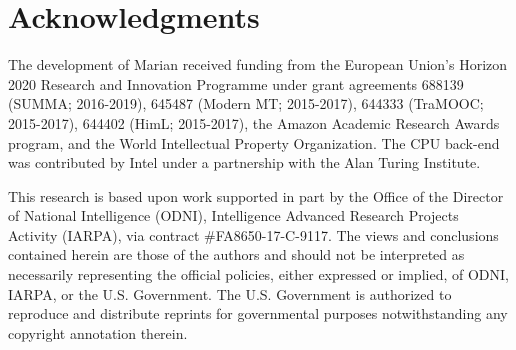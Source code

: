 \documentclass[11pt,a4paper]{article}
\begin{document}
  \section*{Acknowledgments}

  {\small The development of Marian received funding from the European Union's Horizon 2020 Research and Innovation Programme under grant agreements 688139 (SUMMA; 2016-2019), 645487 (Modern MT; 2015-2017), 644333 (TraMOOC; 2015-2017), 644402 (HimL; 2015-2017), the Amazon Academic Research Awards program, and the World Intellectual Property Organization. The CPU back-end was contributed by Intel under a partnership with the Alan Turing Institute. 

   This research is based upon work supported in part by the Office of the Director of National Intelligence (ODNI), Intelligence Advanced Research Projects Activity (IARPA), via contract \#FA8650-17-C-9117. The views and conclusions contained herein are those of the authors and should not be interpreted as necessarily representing the official policies, either expressed or implied, of ODNI, IARPA, or the U.S. Government. The U.S. Government is authorized to reproduce and distribute reprints for governmental purposes notwithstanding any copyright annotation therein.\par}

  
  
  
\end{document}
